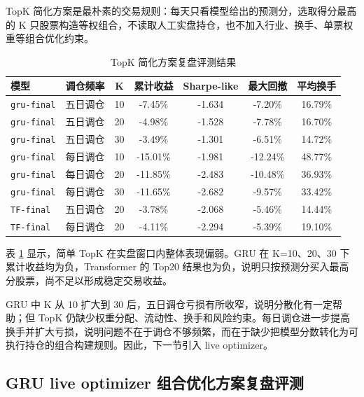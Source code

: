 \documentclass[12pt,a4paper,cn,bibtex]{elegantpaper}
\newcommand{\modelname}[1]{\nolinkurl{#1}}
\begin{document}
TopK 简化方案是最朴素的交易规则：每天只看模型给出的预测分，选取得分最高的 K 只股票构造等权组合，不读取人工实盘持仓，也不加入行业、换手、单票权重等组合优化约束。
\begin{table}[H]
    \centering
    \small
    \setlength{\tabcolsep}{3pt}
    \begin{tabular}{llccccc}
        \toprule
        \textbf{模型} & \textbf{调仓频率} & \textbf{K} & \textbf{累计收益} & \textbf{Sharpe-like} & \textbf{最大回撤} & \textbf{平均换手} \\
        \midrule
        \modelname{gru-final} & 五日调仓 & 10 & -7.45\% & -1.634 & -7.20\% & 16.79\% \\
        \modelname{gru-final} & 五日调仓 & 20 & -4.98\% & -1.528 & -7.78\% & 16.70\% \\
        \modelname{gru-final} & 五日调仓 & 30 & -3.49\% & -1.301 & -6.51\% & 14.72\% \\
        \modelname{gru-final} & 每日调仓 & 10 & -15.01\% & -1.981 & -12.24\% & 48.77\% \\
        \modelname{gru-final} & 每日调仓 & 20 & -11.85\% & -2.483 & -10.48\% & 36.93\% \\
        \modelname{gru-final} & 每日调仓 & 30 & -11.65\% & -2.682 & -9.57\% & 33.42\% \\
        \modelname{TF-final} & 五日调仓 & 20 & -3.78\% & -2.068 & -5.46\% & 14.44\% \\
        \modelname{TF-final} & 每日调仓 & 20 & -4.11\% & -2.294 & -5.39\% & 19.10\% \\
        \bottomrule
    \end{tabular}
    \caption{TopK 简化方案复盘评测结果}
    \label{tab:live-same-day-topk}
\end{table}

表 \ref{tab:live-same-day-topk} 显示，简单 TopK 在实盘窗口内整体表现偏弱。GRU 在 K=10、20、30 下累计收益均为负，Transformer 的 Top20 结果也为负，说明只按预测分买入最高分股票，尚不足以形成稳定交易收益。

GRU 中 K 从 10 扩大到 30 后，五日调仓亏损有所收窄，说明分散化有一定帮助；但 TopK 仍缺少权重分配、流动性、换手和风险约束。每日调仓进一步提高换手并扩大亏损，说明问题不在于调仓不够频繁，而在于缺少把模型分数转化为可执行持仓的组合构建规则。因此，下一节引入 live optimizer。

\subsection{GRU live optimizer 组合优化方案复盘评测}
\end{document}
